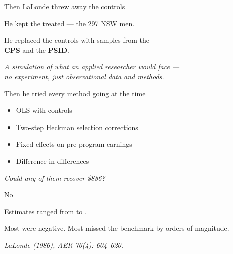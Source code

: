 \documentclass[11pt,aspectratio=169]{beamer}
\begin{document}
\begin{frame}{Then LaLonde threw away the controls}
\vspace{1em}
\begin{center}
\large
He kept the treated --- the 297 NSW men.
\end{center}
\vspace{0.6em}
\begin{center}
\large
He replaced the controls with samples from the \\[0.2em] \textbf{CPS} and the \textbf{PSID}.
\end{center}
\vspace{0.8em}
\begin{center}
\small\color{warmgray}\itshape
A simulation of what an applied researcher would face --- \\
no experiment, just observational data and methods.
\end{center}
\end{frame}

\begin{frame}{Then he tried every method going at the time}
\vspace{0.6em}
\begin{itemize}
  \item OLS with controls
  \item Two-step Heckman selection corrections
  \item Fixed effects on pre-program earnings
  \item Difference-in-differences
\end{itemize}
\vspace{0.6em}
\begin{center}
\large\itshape\color{charcoal}
Could any of them recover \$886?
\end{center}
\end{frame}

\begin{frame}{No}
\vspace{1.6em}
\begin{center}
\large
Estimates ranged from \; \;to \;.
\end{center}
\vspace{1em}
\begin{center}
\large
Most were negative. \;Most missed the benchmark by orders of magnitude.
\end{center}
\vspace{1em}
\begin{center}
\small\color{warmgray}\itshape
LaLonde (1986), \textit{AER} 76(4): 604--620.
\end{center}
\end{frame}
\end{document}
